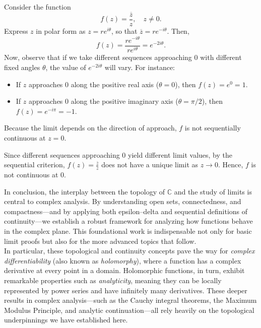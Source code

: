\exampleline
\begin{example}
Consider the function 
\[
f(z) = \frac{\overline{z}}{z}, \quad z \neq 0.
\]
Express \(z\) in polar form as \(z = re^{i\theta}\), so that \(\overline{z} = re^{-i\theta}\). Then,
\[
f(z) = \frac{re^{-i\theta}}{re^{i\theta}} = e^{-2i\theta}.
\]
Now, observe that if we take different sequences approaching 0 with different fixed angles \(\theta\), the value of \(e^{-2i\theta}\) will vary. For instance:
\begin{itemize}
    \item If \(z\) approaches 0 along the positive real axis (\(\theta = 0\)), then \(f(z) = e^0 = 1\).
    \item If \(z\) approaches 0 along the positive imaginary axis (\(\theta = \pi/2\)), then \(f(z) = e^{-i\pi} = -1\).
\end{itemize}
Because the limit depends on the direction of approach, \(f\) is not sequentially continuous at \(z = 0\).
\begin{solution}
Since different sequences approaching \(0\) yield different limit values, by the sequential criterion, \(f(z) = \frac{\overline{z}}{z}\) does not have a unique limit as \(z \to 0\). Hence, \(f\) is not continuous at 0.
\end{solution}
\end{example}
\exampleline

\noindent In conclusion, the interplay between the topology of \(\mathbb{C}\) and the study of limits is central to complex analysis. By understanding open sets, connectedness, and compactness—and by applying both epsilon–delta and sequential definitions of continuity—we establish a robust framework for analyzing how functions behave in the complex plane. This foundational work is indispensable not only for basic limit proofs but also for the more advanced topics that follow. \\

\noindent In particular, these topological and continuity concepts pave the way for \emph{complex differentiability} (also known as \emph{holomorphy}), where a function has a complex derivative at every point in a domain. Holomorphic functions, in turn, exhibit remarkable properties such as \emph{analyticity}, meaning they can be locally represented by power series and have infinitely many derivatives. These deeper results in complex analysis—such as the Cauchy integral theorems, the Maximum Modulus Principle, and analytic continuation—all rely heavily on the topological underpinnings we have established here.  \\

